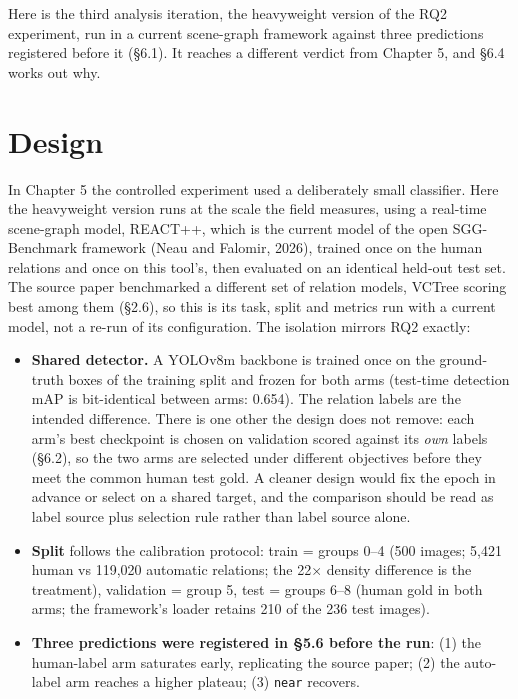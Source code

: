 
Here is the third analysis iteration, the heavyweight version of the RQ2 experiment, run in a current scene-graph framework against three predictions registered before it (\S{}6.1). It reaches a different verdict from Chapter 5, and \S{}6.4 works out why.

\section{Design}

In Chapter 5 the controlled experiment used a deliberately small classifier. Here the heavyweight version runs at the scale the field measures, using a real-time scene-graph model, REACT++, which is the current model of the open SGG-Benchmark framework (Neau and Falomir, 2026), trained once on the human relations and once on this tool's, then evaluated on an identical held-out test set. The source paper benchmarked a different set of relation models, VCTree scoring best among them (\S{}2.6), so this is its task, split and metrics run with a current model, not a re-run of its configuration. The isolation mirrors RQ2 exactly:

\begin{itemize}
\item \textbf{Shared detector.} A YOLOv8m backbone is trained once on the ground-truth boxes of the training split and frozen for both arms (test-time detection mAP is bit-identical between arms: 0.654). The relation labels are the intended difference. There is one other the design does not remove: each arm's best checkpoint is chosen on validation scored against its \textit{own} labels (\S{}6.2), so the two arms are selected under different objectives before they meet the common human test gold. A cleaner design would fix the epoch in advance or select on a shared target, and the comparison should be read as label source plus selection rule rather than label source alone.
\item \textbf{Split} follows the calibration protocol: train = groups 0--4 (500 images; 5,421 human vs 119,020 automatic relations; the 22$\times$ density difference is the treatment), validation = group 5, test = groups 6--8 (human gold in both arms; the framework's loader retains 210 of the 236 test images).
\item \textbf{Three predictions were registered in \S{}5.6 before the run}: (1) the human-label arm saturates early, replicating the source paper; (2) the auto-label arm reaches a higher plateau; (3) \texttt{near} recovers.
\end{itemize}


